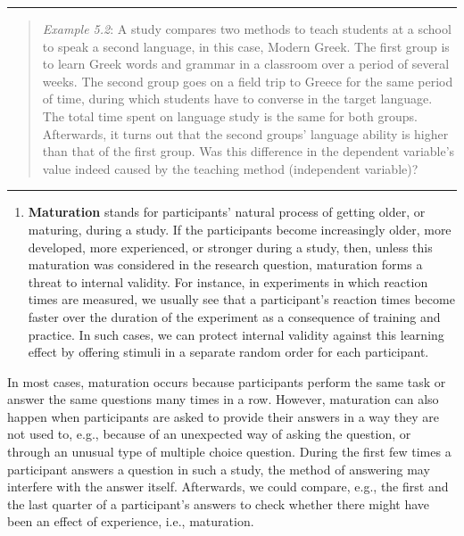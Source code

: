 \documentclass[
]{book}
\providecommand{\tightlist}{%
  \setlength{\itemsep}{0pt}\setlength{\parskip}{0pt}}
\begin{document}
\begin{center}\rule{0.5\linewidth}{0.5pt}\end{center}

\begin{quote}
\emph{Example 5.2}: A study compares two methods to teach students at a school to speak a second language, in this case, Modern Greek. The first group is to learn Greek words and grammar in a classroom over a period of several weeks. The second group goes on a field trip to Greece for the same period of time, during which students have to converse in the target language. The total time spent on language study is the same for both groups. Afterwards, it turns out that the second groups' language ability is higher than that of the first group. Was this difference in the dependent variable's value indeed caused by the teaching method (independent variable)?
\end{quote}

\begin{center}\rule{0.5\linewidth}{0.5pt}\end{center}

\begin{enumerate}
\def\labelenumi{\arabic{enumi}.}
\setcounter{enumi}{1}
\tightlist
\item
  \textbf{Maturation} stands for participants' natural process of getting older, or maturing, during a study. If the participants become increasingly older, more developed, more experienced, or stronger during a study, then, unless this maturation was considered in the research question, maturation forms a threat to internal validity. For instance, in experiments in which reaction times are measured, we usually see that a participant's reaction times become faster over the duration of the experiment as a consequence of training and practice. In such cases, we can protect internal validity against this learning effect by offering stimuli in a separate random order for each participant.
\end{enumerate}

In most cases, maturation occurs because participants perform the same task or answer the same questions many times in a row. However, maturation can also happen when participants are asked to provide their answers in a way they are not used to, e.g., because of an unexpected way of asking the question, or through an unusual type of multiple choice question. During the first few times a participant answers a question in such a study, the method of answering may interfere with the answer itself. Afterwards, we could compare, e.g., the first and the last quarter of a participant's answers to check whether there might have been an effect of experience, i.e., maturation.
\end{document}
